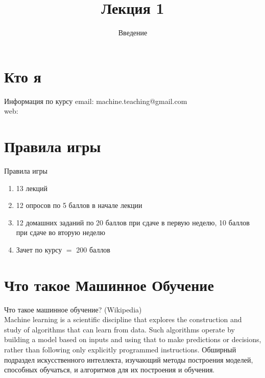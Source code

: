 \documentclass[10pt]{beamer}
\title{Лекция 1}
\subtitle{Введение}
\begin{document}
\maketitle

\section{Кто я}

\begin{frame}{Информация по курсу}
  email: machine.teaching@gmail.com \\
  web: \\
\end{frame}

\section{Правила игры}

\begin{frame}{Правила игры}
  \begin{enumerate} [-]  
    \item 13 лекций
    \item 12 опросов по 5 баллов в начале лекции
    \item 12 домашних заданий по 20 баллов при сдаче в первую неделю, 10 баллов при сдаче во вторую неделю
    \bigbreak
    \item Зачет по курсу $=$ 200 баллов
  \end{enumerate}  
\end{frame}

\section{Что такое Машинное Обучение}

{
\begin{frame}{Что такое машинное обучение?}
  \alert{(Wikipedia)}\\
  Machine learning is a scientific discipline that explores the construction and study of algorithms that can learn from data. Such algorithms operate by building a model based on inputs and using that to make predictions or decisions, rather than following only explicitly programmed instructions. 
  \bigbreak
  Обширный подраздел искусственного интеллекта, изучающий методы построения моделей, способных обучаться, и алгоритмов для их построения и обучения.\\
\end{frame}
}
\end{document}
